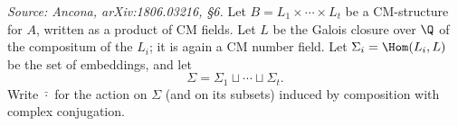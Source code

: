 \begin{definition}
  \label{def:cm-sigma}
  \textit{Source: Ancona, arXiv:1806.03216, §6.}
  Let \(B = L_1 \times \cdots \times L_t\) be a CM-structure for \(A\), written
  as a product of CM fields. Let \(L\) be the Galois closure over \(\Q\) of the
  compositum of the \(L_i\); it is again a CM number field. Let
  \(\Sigma_i = \Hom(L_i, L)\) be the set of embeddings, and let
  \[\Sigma = \Sigma_1 \sqcup \cdots \sqcup \Sigma_t.\]
  Write \(\bar{\cdot}\) for the action on \(\Sigma\) (and on its subsets) induced
  by composition with complex conjugation.
\end{definition}

